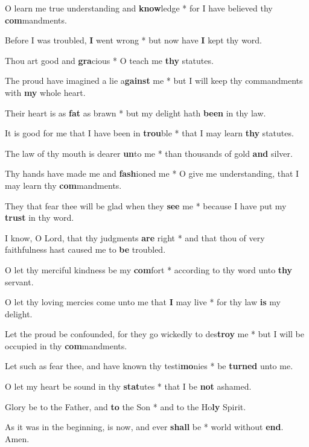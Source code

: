 \begin{multicols}{2}
	O learn me true understanding and \textbf{know}ledge * for I have believed thy \textbf{com}mandments.
	
	Before I was troubled, \textbf{I} went wrong * but now have \textbf{I} kept thy word.
	
	Thou art good and \textbf{gra}cious * O teach me \textbf{thy} statutes.
	
	The proud have imagined a lie a\textbf{gainst} me * but I will keep thy commandments with \textbf{my} whole heart.
	
	Their heart is as \textbf{fat} as brawn * but my delight hath \textbf{been} in thy law.
	
	It is good for me that I have been in \textbf{trou}ble * that I may learn \textbf{thy} statutes.
	
	The law of thy mouth is dearer \textbf{un}to me * than thousands of gold \textbf{and} silver.
	
	Thy hands have made me and \textbf{fash}ioned me * O give me understanding, that I may learn thy \textbf{com}mandments.
	
	They that fear thee will be glad when they \textbf{see} me * because I have put my \textbf{trust} in thy word.
	
	I know, O Lord, that thy judgments \textbf{are} right * and that thou of very faithfulness hast caused me to \textbf{be} troubled.
	
	O let thy merciful kindness be my \textbf{com}fort * according to thy word unto \textbf{thy} servant.
	
	O let thy loving mercies come unto me that \textbf{I} may live * for thy law \textbf{is} my delight.
	
	Let the proud be confounded, for they go wickedly to des\textbf{troy} me * but I will be occupied in thy \textbf{com}mandments.
	
	Let such as fear thee, and have known thy testi\textbf{mo}nies * be \textbf{turned} unto me.
	
	O let my heart be sound in thy \textbf{stat}utes * that I be \textbf{not} ashamed.
	
	Glory be to the Father, and \textbf{to} the Son * and to the Ho\textbf{ly} Spirit.
	
	As it was in the beginning, is now, and ever \textbf{shall} be * world without \textbf{end}. Amen.
\end{multicols}